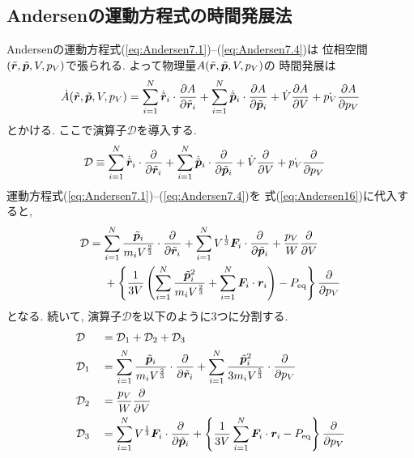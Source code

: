 \subsection{Andersenの運動方程式の時間発展法}
Andersenの運動方程式(\ref{eq:Andersen7.1})--(\ref{eq:Andersen7.4})は
位相空間$(\Tilde{\bm{r}},\Tilde{\bm{p}},V,p_{V})$で張られる. 
よって物理量$A(\Tilde{\bm{r}},\Tilde{\bm{p}},V,p_{V})$の
時間発展は
\begin{equation}
 \dot{A}(\Tilde{\bm{r}},\Tilde{\bm{p}},V,p_{V})
  =
  \sum_{i=1}^{N} \dot{\Tilde{\bm{r}}}_{i}
                 \cdot \frac{\partial A}{\partial \Tilde{\bm{r}}_{i}}
  +
  \sum_{i=1}^{N} \dot{\Tilde{\bm{p}}}_{i}
                 \cdot \frac{\partial A}{\partial \Tilde{\bm{p}}_{i}}
  +
  \dot{V} \frac{\partial A}{\partial V}
  +
  \dot{p_{V}} \frac{\partial A}{\partial p_{V}}
  \label{eq:Andersen15}
\end{equation}
とかける. ここで演算子$\mathcal{D}$を導入する. 
\begin{align}
 \mathcal{D}
 &\equiv
  \sum_{i=1}^{N} \dot{\Tilde{\bm{r}}}_{i}
                 \cdot \frac{\partial}{\partial \Tilde{\bm{r}}_{i}}
  +
  \sum_{i=1}^{N} \dot{\Tilde{\bm{p}}}_{i}
                 \cdot \frac{\partial}{\partial \Tilde{\bm{p}}_{i}}
  +
  \dot{V} \frac{\partial}{\partial V}
  +
 \dot{p_{V}} \frac{\partial}{\partial p_{V}}
  \label{eq:Andersen16}
\end{align}
運動方程式(\ref{eq:Andersen7.1})--(\ref{eq:Andersen7.4})を
式(\ref{eq:Andersen16})に代入すると, 
\begin{align}
 \mathcal{D}
  &=
  \sum_{i=1}^{N} \frac{\Tilde{\bm{p}}_{i}}{m_{i} V^{\frac{2}{3}}}
                 \cdot \frac{\partial}{\partial \Tilde{\bm{r}}_{i}}
  +
  \sum_{i=1}^{N} V^{\frac{1}{3}} \bm{F}_{i}
                 \cdot \frac{\partial}{\partial \Tilde{\bm{p}}_{i}}
  +
  \frac{p_{V}}{W} \frac{\partial}{\partial V}
  \\
  &~~~~+
  \left\{
  \frac{1}{3V}
    \left(
          \sum_{i=1}^{N} \frac{\Tilde{\bm{p}}^{2}_{i}}{m_{i} V^{\frac{2}{3}}}
        + \sum_{i=1}^{N} \bm{F}_{i} \cdot \bm{r}_{i}
    \right)
 - P_{\mathrm{eq}}
 \right\}
 \frac{\partial}{\partial p_{V}}
 \label{eq:Andersen17}
\end{align}
となる. 続いて, 演算子$\mathcal{D}$を以下のように3つに分割する. 
\begin{alignat}{2}
 &\mathcal{D}
 &&= \mathcal{D}_{1} + \mathcal{D}_{2} + \mathcal{D}_{3}
 \label{eq:Andersen18.1}
 \\
 &\mathcal{D}_{1}
 &&=
 \sum_{i=1}^{N} \frac{\Tilde{\bm{p}}_{i}}{m_{i} V^{\frac{2}{3}}}
                 \cdot \frac{\partial}{\partial \Tilde{\bm{r}}_{i}}
 +
 \sum_{i=1}^{N} \frac{\Tilde{\bm{p}}^{2}_{i}}{3 m_{i} V^{\frac{5}{3}}}
 \cdot \frac{\partial}{\partial p_{V}}
 \label{eq:Andersen18.2}
 \\
 &\mathcal{D}_{2}
 &&=
 \frac{p_{V}}{W} \frac{\partial}{\partial V}
 \label{eq:Andersen18.3}
 \\
 &\mathcal{D}_{3}
 &&=
 \sum_{i=1}^{N} V^{\frac{1}{3}} \bm{F}_{i}
 \cdot  \frac{\partial}{\partial \Tilde{\bm{p}}_{i}}
 + \left\{
   \frac{1}{3V} \sum_{i=1}^{N} \bm{F}_{i} \cdot \bm{r}_{i} - P_{\mathrm{eq}}
   \right\}
   \frac{\partial}{\partial p_{V}}
 \label{eq:Andersen18.4}
\end{alignat}
